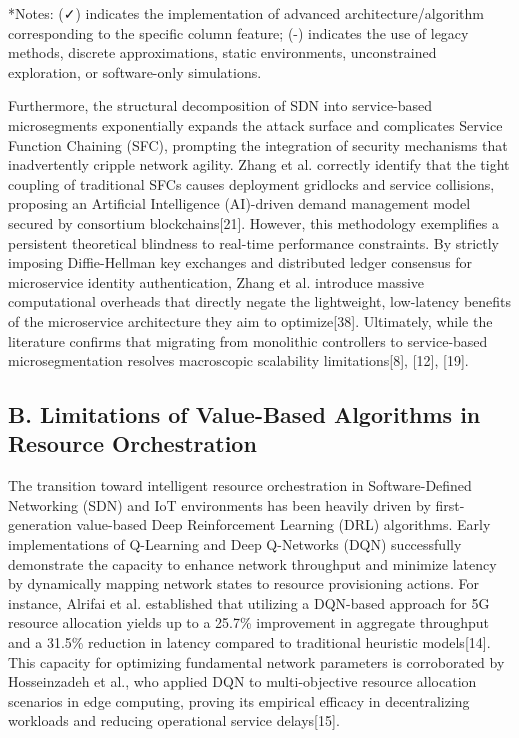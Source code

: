 *Notes: (✓) indicates the implementation of advanced architecture/algorithm corresponding to the specific column feature; (-) indicates the use of legacy methods, discrete approximations, static environments, unconstrained exploration, or software-only simulations.

Furthermore, the structural decomposition of SDN into service-based microsegments exponentially expands the attack surface and complicates Service Function Chaining (SFC), prompting the integration of security mechanisms that inadvertently cripple network agility. Zhang et al. correctly identify that the tight coupling of traditional SFCs causes deployment gridlocks and service collisions, proposing an Artificial Intelligence (AI)-driven demand management model secured by consortium blockchains{[}21{]}. However, this methodology exemplifies a persistent theoretical blindness to real-time performance constraints. By strictly imposing Diffie-Hellman key exchanges and distributed ledger consensus for microservice identity authentication, Zhang et al. introduce massive computational overheads that directly negate the lightweight, low-latency benefits of the microservice architecture they aim to optimize{[}38{]}. Ultimately, while the literature confirms that migrating from monolithic controllers to service-based microsegmentation resolves macroscopic scalability limitations{[}8{]}, {[}12{]}, {[}19{]}.

\subsection{B. Limitations of Value-Based Algorithms in Resource Orchestration}\label{b.-limitations-of-value-based-algorithms-in-resource-orchestration}

The transition toward intelligent resource orchestration in Software-Defined Networking (SDN) and IoT environments has been heavily driven by first-generation value-based Deep Reinforcement Learning (DRL) algorithms. Early implementations of Q-Learning and Deep Q-Networks (DQN) successfully demonstrate the capacity to enhance network throughput and minimize latency by dynamically mapping network states to resource provisioning actions. For instance, Alrifai et al. established that utilizing a DQN-based approach for 5G resource allocation yields up to a 25.7\% improvement in aggregate throughput and a 31.5\% reduction in latency compared to traditional heuristic models{[}14{]}. This capacity for optimizing fundamental network parameters is corroborated by Hosseinzadeh et al., who applied DQN to multi-objective resource allocation scenarios in edge computing, proving its empirical efficacy in decentralizing workloads and reducing operational service delays{[}15{]}.

